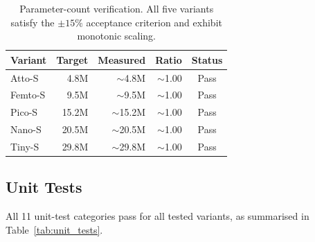 \documentclass{article}
\newcommand{\passmark}{\textnormal{Pass}}
\begin{document}
\begin{table}[h]
  \centering
  \caption{Parameter-count verification. All five variants satisfy the
  $\pm 15\%$ acceptance criterion and exhibit monotonic scaling.}
  \label{tab:params}
  \small
  \begin{tabular}{lrrrc}
  \toprule
  \textbf{Variant} & \textbf{Target} & \textbf{Measured} & \textbf{Ratio} & \textbf{Status} \\
  \midrule
  Atto-S  & 4.8M & $\sim$4.8M & $\sim$1.00 & \passmark \\
  Femto-S & 9.5M & $\sim$9.5M & $\sim$1.00 & \passmark \\
  Pico-S  & 15.2M & $\sim$15.2M & $\sim$1.00 & \passmark \\
  Nano-S  & 20.5M & $\sim$20.5M & $\sim$1.00 & \passmark \\
  Tiny-S  & 29.8M & $\sim$29.8M & $\sim$1.00 & \passmark \\
  \bottomrule
  \end{tabular}
\end{table}

\subsection{Unit Tests}

All 11 unit-test categories pass for all tested variants, as summarised in
Table~\ref{tab:unit_tests}.
\end{document}
